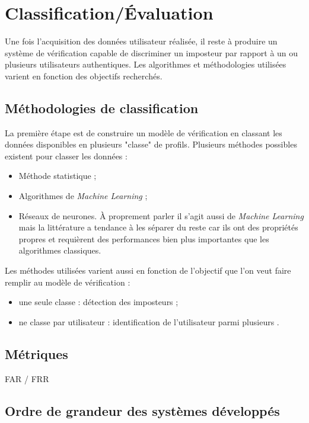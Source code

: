 \section{Classification/Évaluation}
Une fois l'acquisition des données utilisateur réalisée, il reste à produire un système de vérification capable de discriminer un imposteur par rapport à un ou plusieurs utilisateurs authentiques. Les algorithmes et méthodologies utilisées varient en fonction des objectifs recherchés.

\subsection{Méthodologies de classification}
La première étape est de construire un modèle de vérification en classant les données disponibles en plusieurs "classe" de profils. Plusieurs méthodes possibles existent pour classer les données :
\begin{itemize}
	\item
	Méthode statistique ;
	\item
	Algorithmes de \textit{Machine Learning} ;
	\item
	Réseaux de neurones. À proprement parler il s'agit aussi de \textit{Machine Learning} mais la littérature a tendance à les séparer du reste car ils ont des propriétés propres et requièrent des performances bien plus importantes que les algorithmes classiques.
\end{itemize}

Les méthodes utilisées varient aussi en fonction de l'objectif que l'on veut faire remplir au modèle de vérification :

\begin{itemize}
	\item une seule classe : détection des imposteurs ;
	\item ne classe par utilisateur : identification de l'utilisateur parmi plusieurs .
\end{itemize}

\subsection{Métriques}
FAR / FRR

\subsection{Ordre de grandeur des systèmes développés}

